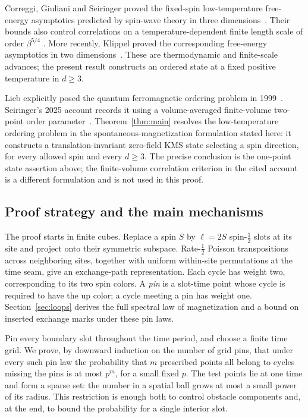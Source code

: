 Correggi, Giuliani and Seiringer proved the fixed-spin low-temperature
free-energy asymptotics predicted by spin-wave theory in three
dimensions~\cite[Theorem~2.1]{CorreggiGiulianiSeiringer2015}.
Their bounds also control correlations on a temperature-dependent
finite length scale of order $\beta^{5/4}$
\cite[equations~(2.6)--(2.8)]{CorreggiGiulianiSeiringer2015}.
More recently, Klippel proved the corresponding free-energy asymptotics
in two dimensions~\cite{Klippel2026FreeEnergy}.  These are thermodynamic
and finite-scale advances; the present result constructs an ordered
state at a fixed positive temperature in $d\ge3$.

Lieb explicitly posed the quantum ferromagnetic ordering problem in
1999~\cite[Problem~A]{Lieb1999}.  Seiringer's 2025 account records it
using a volume-averaged finite-volume two-point order
parameter~\cite{Seiringer2025}.  Theorem~\ref{thm:main} resolves the
low-temperature ordering problem in the spontaneous-magnetization
formulation stated here: it constructs a translation-invariant
zero-field KMS state selecting a spin direction, for every allowed spin
and every $d\ge3$.  The precise conclusion is the one-point state
assertion above; the finite-volume correlation criterion in the cited
account is a different formulation and is not used in this proof.

\subsection{Proof strategy and the main mechanisms}

The proof starts in finite cubes.  Replace a spin $S$ by
$\ell=2S$ spin-$\frac12$ slots at its site and project onto their symmetric
subspace.  Rate-$\frac12$ Poisson transpositions across neighboring sites,
together with uniform within-site permutations at the time seam, give
an exchange-path representation.  Each cycle has weight two, corresponding
to its two spin colors.  A \emph{pin} is a slot-time point whose cycle
is required to have the up color; a cycle meeting a pin has weight one.
Section~\ref{sec:loops} derives the full spectral law of magnetization
and a bound on inserted exchange marks under these pin laws.

Pin every boundary slot throughout the time period, and choose a finite
time grid.  We prove, by downward induction on the number of grid pins,
that under every such pin law the probability that $m$ prescribed points all
belong to cycles missing the pins is at most $p^m$, for a small fixed
$p$.  The test points lie at one time and form a sparse set: the number
in a spatial ball grows at most a small power of its radius.  This
restriction is enough both to control obstacle components and, at the
end, to bound the probability for a single interior slot.

